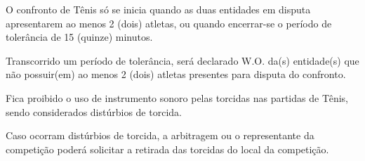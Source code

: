 \begin{article}
	O confronto de Tênis só se inicia quando as duas entidades em disputa apresentarem ao menos 2 (dois) atletas, ou quando encerrar-se o período de tolerância de 15 (quinze) minutos.

	\begin{xparagraph}
		Transcorrido um período de tolerância, será declarado W.O. da(s) entidade(s) que não possuir(em) ao menos 2 (dois) atletas presentes para disputa do confronto.
	\end{xparagraph}
\end{article}

\begin{article}
	Fica proibido o uso de instrumento sonoro pelas torcidas nas partidas de Tênis, sendo considerados distúrbios de torcida.

	\begin{xparagraph}
		Caso ocorram distúrbios de torcida, a arbitragem ou o representante da competição poderá solicitar a retirada das torcidas do local da competição.
	\end{xparagraph}
\end{article}
